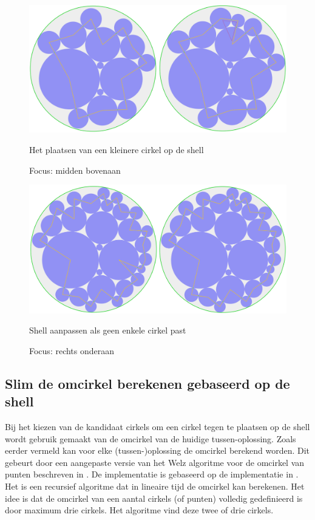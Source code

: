 \documentclass[12pt,a4paper,oneside]{book}
\begin{document}
\begin{figure}
  \centering
  \includegraphics[width=1.0\textwidth]{plaats-op-shell-kleiner.png}
  \caption{Het plaatsen van een kleinere cirkel op de shell} \label{fig:plaats-op-shell-kleiner} 
  \caption*{Focus: midden bovenaan}
\end{figure}

\begin{figure}
  \centering
  \includegraphics[width=1.0\textwidth]{plaats-op-shell-geen-enkele-past.png}
  \caption{Shell aanpassen als geen enkele cirkel past} \label{fig:plaats-op-shell-geen-enkele-past} 
  \caption*{Focus: rechts onderaan}
\end{figure}

\subsection{Slim de omcirkel berekenen gebaseerd op de shell}

Bij het kiezen van de kandidaat cirkels om een cirkel tegen te plaatsen op de shell wordt gebruik gemaakt van de omcirkel van de huidige tussen-oplossing.
Zoals eerder vermeld kan voor elke (tussen-)oplossing de omcirkel berekend worden.
Dit gebeurt door een aangepaste versie van het Welz algoritme voor de omcirkel van punten beschreven in \cite{welzl1991smallest}.
De implementatie is gebaseerd op de implementatie in \cite{sunshine2008welzl}.
Het is een recursief algoritme dat in lineaire tijd de omcirkel kan berekenen.
Het idee is dat de omcirkel van een aantal cirkels (of punten) volledig gedefinieerd is door maximum drie cirkels.
Het algoritme vind deze twee of drie cirkels.
\end{document}
